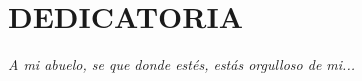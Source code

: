 \chapter*{DEDICATORIA}
\begin{flushright}
\textit{A mi abuelo, se que donde estés, estás orgulloso de mi...}
\end{flushright}
